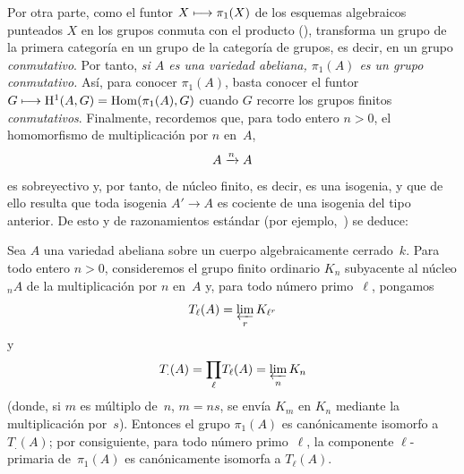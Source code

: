 Por otra parte, como el funtor $X\longmapsto\pi_1(X)$ de los esquemas algebraicos
punteados $X$ en los grupos conmuta con el producto (),
transforma un grupo de la primera categoría en un grupo de la categoría de
grupos, es decir, en un grupo \emph{conmutativo}. Por tanto, \emph{si $A$ es
una variedad abeliana, $\pi_1(A)$
es un grupo conmutativo.} Así, para conocer $\pi_1(A)$, basta conocer el
funtor $G\longmapsto\mathrm H^1(A,G)=\operatorname{Hom}(\pi_1(A),G)$ cuando $G$ recorre los grupos
finitos \emph{conmutativos}. Finalmente, recordemos que, para todo entero
$n>0$, el homomorfismo de multiplicación por $n$ en~$A$,
$$
A\xrightarrow{n} A
$$
es sobreyectivo y, por tanto, de núcleo finito, es decir, es una isogenia,
y que de ello resulta que toda isogenia $A'\to A$ es cociente de una
isogenia del tipo anterior. De esto y de razonamientos estándar
(\cf por ejemplo,~\cite{XI.6}) se deduce:

\begin{theoreme}
\label{XI.2.1}
Sea $A$ una variedad abeliana sobre un cuerpo algebraicamente cerrado~$k$.
Para todo entero $n>0$, consideremos el grupo finito ordinario $K_n$
subyacente al núcleo ${}_nA$ de la multiplicación por $n$ en~$A$ y, para
todo número primo~$\ell$, pongamos
$$
T_\ell(A)=\varprojlim_r K_{\ell^r}
$$
y
$$
T_{.}(A)=\underset{\ell}{\prod}T_\ell(A)=\varprojlim_n K_n
$$
(donde, si $m$ es múltiplo de~$n$, $m=ns$, se envía $K_m$ en $K_n$
mediante la multiplicación por~$s$). Entonces el grupo $\pi_1(A)$ es
canónicamente isomorfo a $T_{.}(A)$; por consiguiente, para todo número
primo~$\ell$, la componente $\ell$-primaria de~$\pi_1(A)$ es canónicamente
isomorfa a $T_\ell(A)$.
\end{theoreme}

